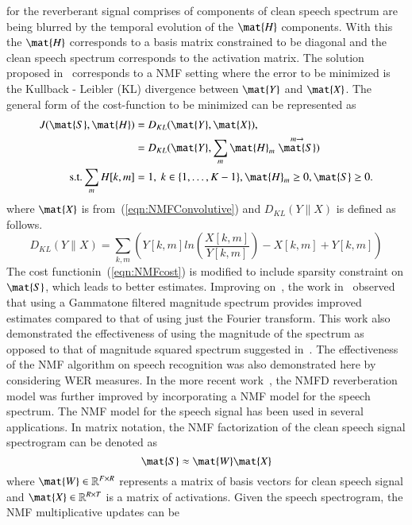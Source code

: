for the reverberant signal comprises of components of clean speech spectrum are
being blurred by the temporal evolution of the $\mat{H}$ components. With this
the $\mat{H}$ corresponds to a basis matrix constrained to be diagonal and the
clean speech spectrum corresponds to the activation matrix. The solution
proposed in~\cite{mohammadiha2016speech} corresponds to a NMF setting where the
error to be minimized is the Kullback - Leibler (KL) divergence between $\mat{Y}$ and
$\mat{X}$. The general form of the cost-function to be minimized can be represented as
\begin{align}
  J(\mat{S},\mat{H}) &= D_{KL}(\mat{Y}, \mat{X}),\\
  &= D_{KL}(\mat{Y}, \sum_{m} \mat{H}_m \stackrel{m\rightarrow}{\mat{S}}) \\
  \text{s.t.} \sum_m H[k,m] &= 1,\ k\in \{1,\ldots,K-1\},  \mat{H}_m \ge 0, \mat{S} \ge 0.
  \label{eqn:NMFcost}
\end{align}
where $\mat{X}$ is from~(\ref{eqn:NMFConvolutive}) and $D_{KL}(Y \parallel X)$ is defined as follows. 
\begin{equation}
D_{KL}(Y \parallel X)=\sum_{k,m} (Y[k,m]ln(\dfrac{X[k,m]}{Y[k,m]})-X[k,m]+Y[k,m])
\end{equation}
The cost functionin~(\ref{eqn:NMFcost}) is modified to include
sparsity constraint on $\mat{S}$, which leads to better estimates. Improving
on~\cite{kameoka2009robust}, the work in~\cite{Kumar2011} observed that using a
Gammatone filtered magnitude spectrum provides improved estimates compared to
that of using just the Fourier transform. This work also demonstrated the
effectiveness of using the magnitude of the spectrum as opposed to that of
magnitude squared spectrum suggested in~\cite{kameoka2009robust}. The
effectiveness of the NMF algorithm on speech recognition was also demonstrated
here by considering WER measures. In the more recent
work~\cite{Mohammadiha2016}, the NMFD reverberation model was further improved by
incorporating a NMF model for the speech spectrum. The NMF model for the speech
signal has been used in several applications. In matrix notation, the NMF
factorization of the clean speech signal spectrogram can be denoted as
\begin{equation}
  \mat{S} \approx \mat{W} \mat{X}
  \label{eqn:NMFspeech}
\end{equation}
where $\mat{W} \in \mathbb{R}^{F \times R}$ represents a matrix of basis vectors
for clean speech signal and $\mat{X} \in \mathbb{R}^{R \times T}$ is a matrix of
activations. Given the speech spectrogram, the NMF multiplicative updates can be
